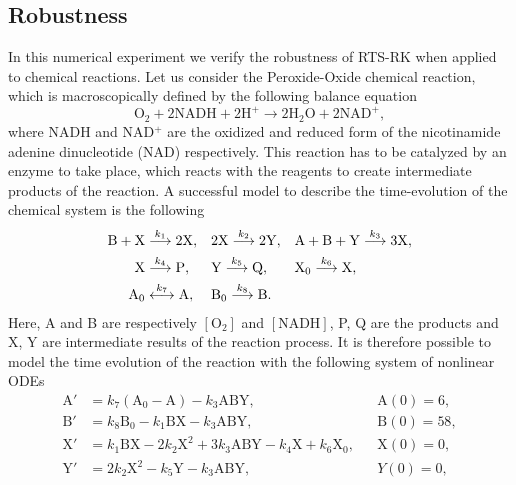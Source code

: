 \documentclass[10pt]{article}
\begin{document}
\subsection{Robustness} In this numerical experiment we verify the robustness of RTS-RK when applied to chemical reactions. Let us consider the Peroxide-Oxide chemical reaction, which is macroscopically defined by the following balance equation
\begin{equation}
	\mathrm{O}_2 + 2\mathrm{NADH} + 2\mathrm{H}^+ \to 2\mathrm{H}_2\mathrm{O} + 2\mathrm{NAD}^+,
\end{equation}
where NADH and NAD$^+$ are the oxidized and reduced form of the nicotinamide adenine dinucleotide (NAD) respectively. This reaction has to be catalyzed by an enzyme to take place, which reacts with the reagents to create intermediate products of the reaction. A successful model \cite{Ols83} to describe the time-evolution of the chemical system is the following
\begin{equation}
\begin{aligned}
	\mathrm{B} + \mathrm{X} &\stackrel{k_1}{\longrightarrow} 2 \mathrm{X}, 
	&&2\mathrm{X} \stackrel{k_2}{\longrightarrow} 2\mathrm{Y}, 
	&&\mathrm{A} + \mathrm{B} + \mathrm{Y} \stackrel{k_3}{\longrightarrow} 3 \mathrm{X}, \\
	\mathrm{X} &\stackrel{k_4}{\longrightarrow} \mathrm{P}, 
	&&\mathrm{Y} \stackrel{k_5}{\longrightarrow} \mathrm{Q}, 
	&&\mathrm{X_0} \stackrel{k_6}{\longrightarrow} \mathrm{X}, \\
	\mathrm{A_0} &\stackrel{k_7}{\longleftrightarrow} \mathrm{A}, 
	&&\mathrm{B_0} \stackrel{k_8}{\longrightarrow} \mathrm{B}.
\end{aligned}
\end{equation}
Here, A and B are respectively $[\mathrm{O}_2]$ and $[\mathrm{NADH}]$, P, Q are the products and X, Y are intermediate results of the reaction process. It is therefore possible to model the time evolution of the reaction with the following system of nonlinear ODEs 
\begin{equation}\label{eq:PeroxOx}
\begin{aligned}
	\mathrm{A}' &= k_7  (\mathrm{A}_0 - \mathrm{A}) - k_3  \mathrm{A}\mathrm{B}\mathrm{Y}, &&\mathrm{A}(0) = 6, \\
	\mathrm{B}' &= k_8\mathrm{B}_0 - k_1  \mathrm{B}\mathrm{X} - k_3  \mathrm{A}\mathrm{B}\mathrm{Y}, &&\mathrm{B}(0) = 58, \\
	\mathrm{X}' &= k_1  \mathrm{B}\mathrm{X} - 2  k_2  \mathrm{X}^2 + 3  k_3 \mathrm{A}\mathrm{B}\mathrm{Y} - k_4  \mathrm{X} + k_6\mathrm{X}_0,&& \mathrm{X}(0) = 0, \\
	\mathrm{Y}' &= 2  k_2  \mathrm{X}^2 - k_5  \mathrm{Y} - k_3  \mathrm{A}\mathrm{B}\mathrm{Y}, && Y(0) = 0,
\end{aligned}
\end{equation}
\end{document}
